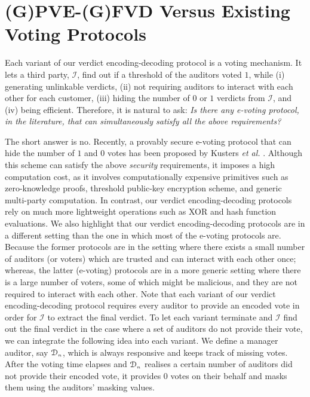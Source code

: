 \vspace{-5mm}
\section{  (G)PVE-(G)FVD Versus Existing Voting Protocols}\label{sec:: Further-Discussion-on-the-Encoding-decoding-Protocol}
\vspace{-1mm}



Each variant of our verdict encoding-decoding protocol is a voting mechanism. It  lets a third party, $\mathcal{I}$, find out if a threshold of the auditors voted $1$, while (i) generating unlinkable verdicts, (ii) not requiring auditors to interact with each other for each customer, (iii) hiding the number of $0$ or $1$ verdicts from  $\mathcal{I}$, and (iv) being  efficient. Therefore, it is natural to ask: \emph{Is there   any {e-voting} protocol, in the literature, that can  simultaneously satisfy all the above requirements?}



The short answer is no. Recently, a provably secure  e-voting protocol that can hide the number of $1$ and $0$ votes has been proposed by K{u}sters \textit{et al.} \cite{KustersL00020}. Although this scheme can satisfy the above \emph{security} requirements, it imposes a high computation cost, as  it involves computationally expensive primitives such as zero-knowledge proofs, threshold public-key encryption scheme, and generic multi-party computation. In contrast, our verdict encoding-decoding protocols rely on much more lightweight operations such as XOR and hash function evaluations.  We also  highlight that our verdict encoding-decoding protocols are in a different setting than the one in which most of the e-voting protocols are. Because the former protocols are in the setting where there exists a small number of auditors (or voters) which are trusted and can interact with each other once; whereas, the latter (e-voting) protocols are in a more  generic setting where there is a large number of  voters, some of which might be malicious, and they are not  required to interact with each other. 
%
Note that each variant of our verdict encoding-decoding protocol requires every auditor to provide an encoded vote  in order for $\mathcal{I}$ to extract the final verdict. To let each variant terminate and $\mathcal{I}$ find out the final verdict in the case where a  set of  auditors do not provide their vote, we can integrate the    following idea into each variant. We define a manager auditor, say $\mathcal{D}_{\scriptscriptstyle n}$, which is always responsive and keeps track of missing votes. After the voting time elapses and $\mathcal{D}_{\scriptscriptstyle n}$ realises a certain  number of auditors did not provide their encoded vote, it provides $0$ votes on their behalf and masks them using the  auditors' masking values. 









